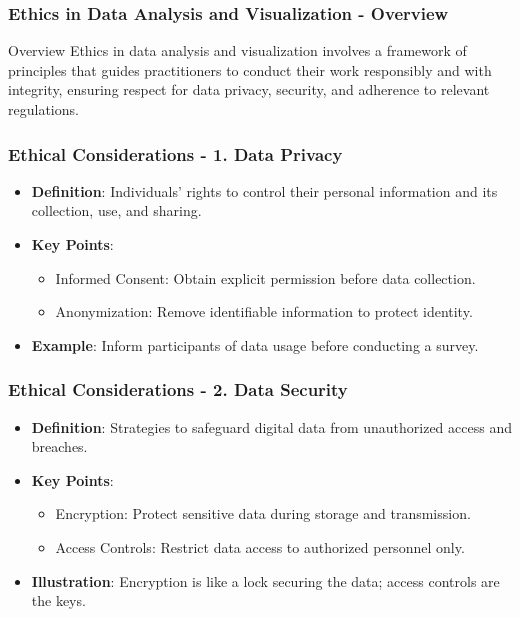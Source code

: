 \documentclass{beamer}
\begin{document}
\begin{frame}[fragile]
    \frametitle{Ethics in Data Analysis and Visualization - Overview}
    \begin{block}{Overview}
        Ethics in data analysis and visualization involves a framework of principles that guides practitioners to conduct their work responsibly and with integrity, ensuring respect for data privacy, security, and adherence to relevant regulations.
    \end{block}
\end{frame}

\begin{frame}[fragile]
    \frametitle{Ethical Considerations - 1. Data Privacy}
    \begin{itemize}
        \item \textbf{Definition}: Individuals' rights to control their personal information and its collection, use, and sharing.
        \item \textbf{Key Points}:
        \begin{itemize}
            \item Informed Consent: Obtain explicit permission before data collection.
            \item Anonymization: Remove identifiable information to protect identity.
        \end{itemize}
        \item \textbf{Example}: Inform participants of data usage before conducting a survey.
    \end{itemize}
\end{frame}

\begin{frame}[fragile]
    \frametitle{Ethical Considerations - 2. Data Security}
    \begin{itemize}
        \item \textbf{Definition}: Strategies to safeguard digital data from unauthorized access and breaches.
        \item \textbf{Key Points}:
        \begin{itemize}
            \item Encryption: Protect sensitive data during storage and transmission.
            \item Access Controls: Restrict data access to authorized personnel only.
        \end{itemize}
        \item \textbf{Illustration}: Encryption is like a lock securing the data; access controls are the keys.
    \end{itemize}
\end{frame}
\end{document}
